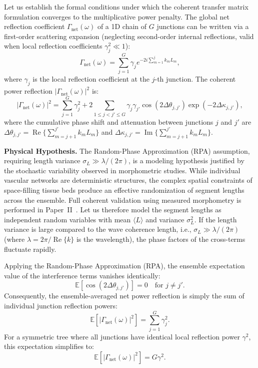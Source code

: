 Let us establish the formal conditions under which the coherent transfer matrix
formulation converges to the multiplicative power penalty. The global net
reflection coefficient $\Gamma_{\mathrm{net}}(\omega)$ of a 1D chain of $G$
junctions can be written via a first-order scattering expansion (neglecting
second-order internal reflections, valid when local reflection coefficients
$\gamma_j^2 \ll 1$):
\begin{equation}
    \Gamma_{\mathrm{net}}(\omega) = \sum_{j=1}^{G} \gamma_j e^{-2 i \sum_{m=1}^{j} k_m L_m},
\end{equation}
where $\gamma_j$ is the local reflection coefficient at the $j$-th junction. The
coherent power reflection $|\Gamma_{\mathrm{net}}(\omega)|^2$ is:
\begin{equation}
    |\Gamma_{\mathrm{net}}(\omega)|^2 = \sum_{j=1}^{G} \gamma_j^2 + 2 \sum_{1 \le j < j' \le G} \gamma_j \gamma_{j'} \cos(2 \Delta\theta_{j,j'}) \exp(-2 \Delta\kappa_{j,j'}),
\end{equation}
where the cumulative phase shift and attenuation between junctions $j$ and $j'$
are $\Delta\theta_{j,j'} = \operatorname{Re}\{ \sum_{m=j+1}^{j'} k_m L_m \}$ and
$\Delta\kappa_{j,j'} = \operatorname{Im}\{ \sum_{m=j+1}^{j'} k_m L_m \}$.

\textbf{Physical Hypothesis.} The Random-Phase Approximation (RPA) assumption,
requiring length variance $\sigma_L \gg \lambda / (2\pi)$, is a modeling
hypothesis justified by the stochastic variability observed in morphometric
studies. While individual vascular networks are deterministic structures, the
complex spatial constraints of space-filling tissue beds produce an effective
randomization of segment lengths across the ensemble. Full coherent validation
using measured morphometry is performed in Paper~II~\cite{paperII}. Let us
therefore model the segment lengths as independent random variables with mean
$\langle L \rangle$ and variance $\sigma_L^2$. If the length variance is large
compared to the wave coherence length, i.e., $\sigma_L \gg \lambda / (2\pi)$
(where $\lambda = 2\pi / \operatorname{Re}\{k\}$ is the wavelength), the phase
factors of the cross-terms fluctuate rapidly.

Applying the Random-Phase Approximation (RPA), the ensemble expectation value of
the interference terms vanishes identically:
\begin{equation}
    \mathbb{E}\left[ \cos(2 \Delta\theta_{j,j'}) \right] = 0 \quad \text{for } j \neq j'.
\end{equation}
Consequently, the ensemble-averaged net power reflection is simply the sum of
individual junction reflection powers:
\begin{equation}
    \mathbb{E}\left[ |\Gamma_{\mathrm{net}}(\omega)|^2 \right] = \sum_{j=1}^{G} \gamma_j^2.
\end{equation}
For a symmetric tree where all junctions have identical local reflection power
$\gamma^2$, this expectation simplifies to:
\begin{equation}
    \mathbb{E}\left[ |\Gamma_{\mathrm{net}}(\omega)|^2 \right] = G \gamma^2.
\end{equation}

